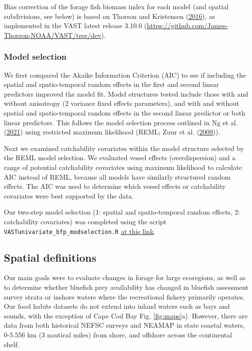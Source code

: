 \documentclass[
]{article}
\begin{document}
Bias correction of the forage fish biomass index for each model (and spatial subdivisions, see below) is based on Thorson and Kristensen (\protect\hyperlink{ref-thorson_implementing_2016}{2016}), as implemented in the VAST latest release 3.10.0 (\url{https://github.com/James-Thorson-NOAA/VAST/tree/dev}).

\hypertarget{model-selection}{%
\subsubsection{Model selection}\label{model-selection}}

We first compared the Akaike Information Criterion (AIC) to see if including the spatial and spatio-temporal random effects in the first and second linear predictors improved the model fit. Model structures tested include those with and without anisotropy (2 variance fixed effects parameters), and with and without spatial and spatio-temporal random effects in the second linear predictor or both linear predictors. This follows the model selection process outlined in Ng et al. (\protect\hyperlink{ref-ng_predator_2021}{2021}) using restricted maximum likelihood (REML; Zuur et al. (\protect\hyperlink{ref-zuur_mixed_2009}{2009})).

Next we examined catchability covariates within the model structure selected by the REML model selection. We evaluated vessel effects (overdispersion) and a range of potential catchability covariates using maximum likelihood to calculate AIC instead of REML, because all models have similarly structured random effects. The AIC was used to determine which vessel effects or catchability covariates were best supported by the data.

Our two-step model selection (1: spatial and spatio-temporal random effects, 2: catchability covariates) was completed using the script \texttt{VASTunivariate\_bfp\_modselection.R} \href{https://github.com/NOAA-EDAB/forageindex/blob/main/VASTscripts/VASTunivariate_bfp_modselection.R}{at this link}.

\hypertarget{spatial-definitions}{%
\subsection{Spatial definitions}\label{spatial-definitions}}

Our main goals were to evaluate changes in forage for large ecoregions, as well as to determine whether bluefish prey availability has changed in bluefish assessment survey strata or inshore waters where the recreational fishery primarily operates. Our food habits datasets do not extend into inland waters such as bays and sounds, with the exception of Cape Cod Bay Fig. \ref{fig:maps}a). However, there are data from both historical NEFSC surveys and NEAMAP in state coastal waters, 0-5.556 km (3 nautical miles) from shore, and offshore across the continental shelf.
\end{document}
